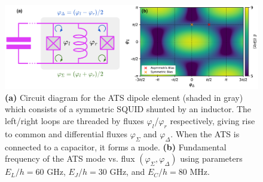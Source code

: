 \begin{figure}[h]
    \centering
    \includegraphics[width=\linewidth]{Figures/5/ats_spectrum.pdf}
    \caption{\textbf{(a)} Circuit diagram for the ATS dipole element (shaded in gray) which consists of a symmetric SQUID shunted by an inductor. The left/right loops are threaded by fluxes $\varphi_l$/$\varphi_r$ respectively, giving rise to common and differential fluxes $\varphi_\Sigma$ and $\varphi_\Delta$. When the ATS is connected to a capacitor, it forms a mode. \textbf{(b)} Fundamental frequency of the ATS mode vs. flux $(\varphi_\Sigma, \varphi_\Delta)$ using parameters $E_L/h = 60$ GHz, $E_J/h = 30$ GHz, and $E_C/h = 80$ MHz.}
    \label{fig:5_ats_spectrum}
\end{figure}

